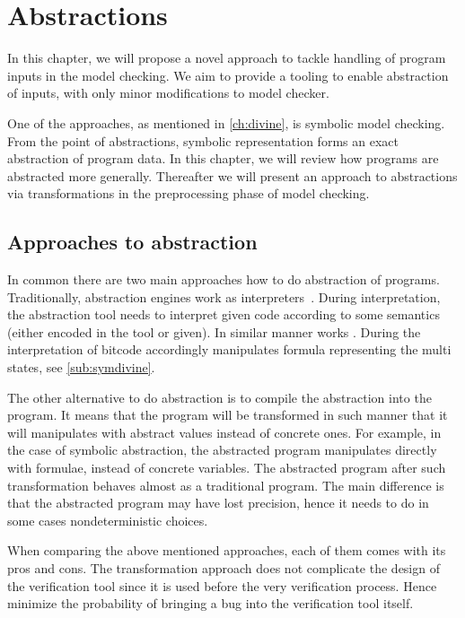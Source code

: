 \chapter{Abstractions}\label{ch:abstraction}

In this chapter, we will propose a novel approach to tackle
handling of program inputs in the model checking. We aim to provide a tooling to
enable abstraction of inputs, with only minor modifications to model checker.

One of the approaches, as mentioned in \autoref{ch:divine}, is symbolic model checking.
From the point of abstractions, symbolic representation forms an exact abstraction
of program data. In this chapter, we will review how programs are abstracted more generally.
Thereafter we will present an approach to abstractions via transformations
in the preprocessing phase of model checking.

\section{Approaches to abstraction}

In common there are two main approaches how to do abstraction of programs.
Traditionally, abstraction engines work as interpreters~\cite{Cousot79}. During
interpretation, the abstraction tool needs to interpret given code according
to some semantics (either encoded in the tool or given). In similar manner works
\SymDIVINE. During the interpretation of \LLVM bitcode \SymDIVINE accordingly
manipulates formula representing the multi states, see \autoref{sub:symdivine}.

The other alternative to do abstraction is to compile the abstraction into the
program. It means that the program will be transformed in such manner that it will
manipulates with abstract values instead of concrete ones. For example, in the
case of symbolic abstraction, the abstracted program manipulates directly with
formulae, instead of concrete variables. The abstracted program after such
transformation behaves almost as a traditional program. The main difference is
that the abstracted program may have lost precision, hence it needs to do
in some cases nondeterministic choices.

When comparing the above mentioned approaches, each of them comes with its pros
and cons. The transformation approach does not complicate the design of the
verification tool since it is used before the very verification process. Hence
minimize the probability of bringing a bug into the verification tool itself.


